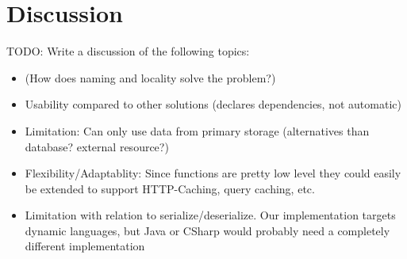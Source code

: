

\section{Discussion}
\label{sec:cachable-function-discussion}

TODO: Write a discussion of the following topics:

\begin{itemize}
  \item (How does naming and locality solve the problem?)
  \item Usability compared to other solutions (declares dependencies, not automatic)
  \item Limitation: Can only use data from primary storage (alternatives than database? external resource?)
  \item Flexibility/Adaptablity: Since functions are pretty low level they could easily be extended to support HTTP-Caching, query caching, etc.
  \item Limitation with relation to serialize/deserialize. Our implementation targets dynamic languages, but Java or CSharp would probably need a completely different implementation
\end{itemize}


